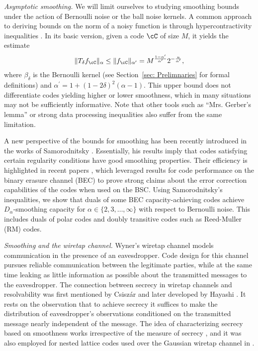 \documentclass{amsart}
\theoremstyle{remark}
\begin{document}
\vspace*{.05in}
\emph{Asymptotic smoothing.}
We will limit ourselves to studying smoothing bounds under the action of Bernoulli noise or the ball noise kernels. 
A common approach to deriving bounds on the norm of a noisy function is through hypercontractivity inequalities \cite{ordentlich2018entropy,polyanskiy2019hypercontractivity,Yu2022}. In its basic version, given a code $\cC$ of size $M$, it yields the estimate
\begin{align*}
    {\|T_{\delta}f_{\cC}\|_{\alpha}  \leq \|f_{\cC}\|_{\alpha^\prime} =  M^\frac{1-\alpha^\prime}{\alpha^\prime}2^{-\frac{n}{\alpha^\prime}},}
\end{align*}
where $\beta_\delta$ is the Bernoulli kernel (see Section~\ref{sec: Prelimnaries} for formal definitions) and $\alpha^\prime = 1+(1-2\delta)^2(\alpha -1)$.
This upper bound does not differentiate codes yielding higher or lower smoothness, which in many situations may not be sufficiently informative. Note that other tools such as ``Mrs. Gerber's lemma'' \cite{wyner1973theorem,ordentlich2018entropy} or strong data processing inequalities also suffer from the same limitation.

A new perspective of the bounds for smoothing has been recently introduced in the works of Samorodnitsky 
\cite{samorodnitsky2016entropy,samorodnitsky2019upper,samorodnitsky2020improved}.
Essentially,  his results imply that codes satisfying certain regularity conditions have good smoothing properties. Their efficiency is highlighted in recent papers  \cite{hkazla2021codes,hkazla2022optimal}, which leveraged results for code performance on the binary erasure channel (BEC) to prove strong claims about the error correction capabilities of the codes when used on the BSC. 
Using Samorodnitsky's inequalities, we show that duals of some BEC capacity-achieving codes achieve $D_{\alpha}$-smoothing capacity for $\alpha \in \{2,3,\dots,\infty\}$ with respect to Bernoulli noise. This includes duals of polar codes and doubly transitive codes such as Reed-Muller (RM) codes.

\emph{Smoothing and the wiretap channel.}
Wyner's wiretap channel \cite{wyner1975wire} models communication in the presence of an eavesdropper. 
Code design for this channel pursues reliable communication between the legitimate parties, while at the same time 
leaking as little information as possible about the transmitted messages to the eavesdropper. 
The connection between secrecy in wiretap channels and resolvability was first mentioned by Csisz{\'a}r \cite{csiszar1996almost} and later developed by Hayashi \cite{hayashi2006general}. It rests on the observation that to achieve secrecy it suffices to make the distribution of eavesdropper's observations conditioned on the transmitted message nearly independent of the message. The idea of characterizing secrecy based on smoothness works irrespective of the measure of secrecy \cite{hayashi2006general,bloch2013strong,yu2018renyi}, and it was also employed for nested lattice codes used over the Gaussian wiretap channel in \cite{belfiore2010secrecy}.
\end{document}
